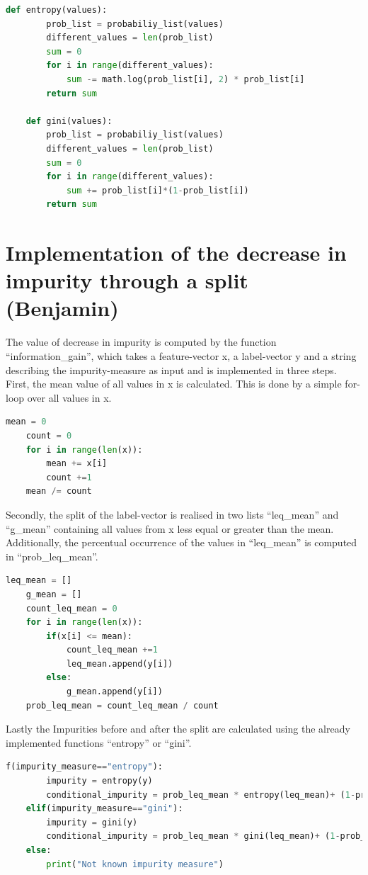 \documentclass[12pt,a4paper]{scrartcl}		%
\begin{document}
\begin{lstlisting}[language=Python]
    def entropy(values):
        prob_list = probabiliy_list(values)
        different_values = len(prob_list)
        sum = 0
        for i in range(different_values):
            sum -= math.log(prob_list[i], 2) * prob_list[i]
        return sum

    def gini(values):
        prob_list = probabiliy_list(values)
        different_values = len(prob_list)
        sum = 0
        for i in range(different_values):
            sum += prob_list[i]*(1-prob_list[i])
        return sum
\end{lstlisting}

\section{Implementation of the decrease in impurity through a split (Benjamin) }
The value of decrease in impurity is computed by the function “information\_gain”, which takes a feature-vector x, 
a label-vector y and a string describing the impurity-measure as input and is implemented in three steps. 
First, the mean value of all values in x is calculated. This is done by a simple for-loop over all values in x.

\begin{lstlisting}[language=Python]
    mean = 0
    count = 0
    for i in range(len(x)):
        mean += x[i]
        count +=1
    mean /= count
\end{lstlisting}

Secondly, the split of the label-vector is realised in two lists “leq\_mean” and “g\_mean” containing all 
values from x less equal or greater than the mean. Additionally, the percentual occurrence of the values 
in “leq\_mean” is computed in “prob\_leq\_mean”.

\begin{lstlisting}[language=Python]
    leq_mean = []
    g_mean = []
    count_leq_mean = 0
    for i in range(len(x)):
        if(x[i] <= mean):
            count_leq_mean +=1
            leq_mean.append(y[i])
        else:
            g_mean.append(y[i])
    prob_leq_mean = count_leq_mean / count
\end{lstlisting}

Lastly the Impurities before and after the split are calculated using the already implemented functions 
“entropy” or “gini”.

\begin{lstlisting}[language=Python]
    f(impurity_measure=="entropy"):
        impurity = entropy(y)
        conditional_impurity = prob_leq_mean * entropy(leq_mean)+ (1-prob_leq_mean) * entropy(g_mean)
    elif(impurity_measure=="gini"):
        impurity = gini(y)
        conditional_impurity = prob_leq_mean * gini(leq_mean)+ (1-prob_leq_mean) * gini(g_mean) 
    else:
        print("Not known impurity measure")

\end{lstlisting}
\end{document}
